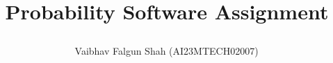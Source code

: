 \documentclass[journal,12pt,twocolumn]{IEEEtran}
\DeclareMathOperator*{\Res}{Res}
\begin{document}
%


\newtheorem{theorem}{Theorem}[section]
\newtheorem{problem}{Problem}
\newtheorem{proposition}{Proposition}[section]
\newtheorem{lemma}{Lemma}[section]
\newtheorem{corollary}[theorem]{Corollary}
\newtheorem{example}{Example}[section]
\newtheorem{definition}[problem]{Definition}

\newcommand{\BEQA}{\begin{eqnarray}}
\newcommand{\EEQA}{\end{eqnarray}}
\newcommand{\define}{\stackrel{\triangle}{=}}


\providecommand{\mbf}{\mathbf}
\providecommand{\pr}[1]{\ensuremath{\Pr\left(#1\right)}}
\providecommand{\qfunc}[1]{\ensuremath{Q\left(#1\right)}}
\providecommand{\sbrak}[1]{\ensuremath{{}\left[#1\right]}}
\providecommand{\lsbrak}[1]{\ensuremath{{}\left[#1\right.}}
\providecommand{\rsbrak}[1]{\ensuremath{{}\left.#1\right]}}
\providecommand{\brak}[1]{\ensuremath{\left(#1\right)}}
\providecommand{\lbrak}[1]{\ensuremath{\left(#1\right.}}
\providecommand{\rbrak}[1]{\ensuremath{\left.#1\right)}}
\providecommand{\cbrak}[1]{\ensuremath{\left\{#1\right\}}}
\providecommand{\lcbrak}[1]{\ensuremath{\left\{#1\right.}}
\providecommand{\rcbrak}[1]{\ensuremath{\left.#1\right\}}}
\theoremstyle{remark}
\newtheorem{rem}{Remark}
\newcommand{\sgn}{\mathop{\mathrm{sgn}}}
\providecommand{\abs}[1]{\left\vert#1\right\vert}
\providecommand{\res}[1]{\Res\displaylimits_{#1}} 
\providecommand{\norm}[1]{\left\lVert#1\right\rVert}

\providecommand{\mtx}[1]{\mathbf{#1}}
\providecommand{\mean}[1]{E\left[ #1 \right]}
\providecommand{\fourier}{\overset{\mathcal{F}}{ \rightleftharpoons}}

\providecommand{\system}{\overset{\mathcal{H}}{ \longleftrightarrow}}
 
\newcommand{\solution}{\noindent \textbf{Solution: }}
\newcommand{\cosec}{\,\text{cosec}\,}
\providecommand{\dec}[2]{\ensuremath{\overset{#1}{\underset{#2}{\gtrless}}}}
\newcommand{\myvec}[1]{\ensuremath{\begin{pmatrix}#1\end{pmatrix}}}
\newcommand{\mydet}[1]{\ensuremath{\begin{vmatrix}#1\end{vmatrix}}}

\let\vec\mathbf

\vspace{3cm}
\title{

Probability Software Assignment

}
\author{ Vaibhav Falgun Shah (AI23MTECH02007)$^{}$
} 
\end{document}
